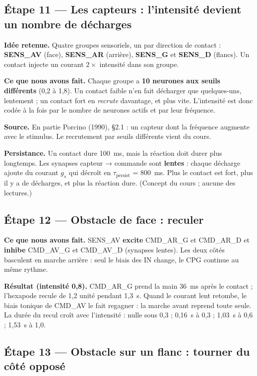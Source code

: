 \documentclass[11pt]{article}
\newcommand{\champ}[2]{\par\noindent\textbf{\color{bleu}#1} #2\par}
\begin{document}
\subsection*{Étape 11 --- Les capteurs : l'intensité devient un nombre de décharges}

\champ{Idée retenue.}{Quatre groupes sensoriels, un par direction de contact :
\textbf{SENS\_AV} (face), \textbf{SENS\_AR} (arrière), \textbf{SENS\_G} et \textbf{SENS\_D}
(flancs). Un contact injecte un courant $2 \times$ intensité dans son groupe.}
\champ{Ce que nous avons fait.}{Chaque groupe a \textbf{10 neurones aux seuils différents} (0,2 à
1,8). Un contact faible n'en fait décharger que quelques-uns, lentement ; un contact fort en
\emph{recrute} davantage, et plus vite. L'intensité est donc codée à la fois par le nombre de
neurones actifs et par leur fréquence.}
\champ{Source.}{En partie Porcino (1990), §2.1 \cite{porcino1990} : un capteur dont la fréquence
augmente avec le stimulus. Le recrutement par seuils différents vient du cours.}
\champ{Persistance.}{Un contact dure 100~ms, mais la réaction doit durer plus longtemps. Les
synapses capteur → commande sont \textbf{lentes} : chaque décharge ajoute du courant $g_s$ qui
décroît en $\tau_{\mathrm{persist}}$ = 800~ms. Plus le contact est fort, plus il y a de décharges,
et plus la réaction dure. (Concept du cours ; aucune des lectures.)}

\subsection*{Étape 12 --- Obstacle de face : reculer}

\champ{Ce que nous avons fait.}{SENS\_AV \textbf{excite} CMD\_AR\_G et CMD\_AR\_D et
\textbf{inhibe} CMD\_AV\_G et CMD\_AV\_D (synapses lentes). Les deux côtés basculent en marche
arrière : seul le biais des IN change, le CPG continue au même rythme.}
\champ{Résultat (intensité 0,8).}{CMD\_AR\_G prend la main 36~ms après le contact ; l'hexapode recule
de 1,2 unité pendant 1,3~s. Quand le courant lent retombe, le biais tonique de CMD\_AV le fait
regagner : la marche avant reprend toute seule. La durée du recul croît avec l'intensité : nulle
sous 0,3 ; 0,16~s à 0,3 ; 1,03~s à 0,6 ; 1,53~s à 1,0.}

\subsection*{Étape 13 --- Obstacle sur un flanc : tourner du côté opposé}
\end{document}
